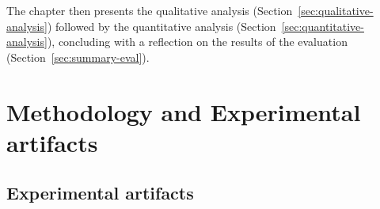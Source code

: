 The chapter then presents the qualitative analysis (Section~\ref{sec:qualitative-analysis}) followed by the quantitative analysis (Section~\ref{sec:quantitative-analysis}), concluding with a reflection on the results of the evaluation (Section~\ref{sec:summary-eval}).




\section{Methodology and Experimental artifacts}\label{sec:eval-method}

\subsection{Experimental artifacts}

